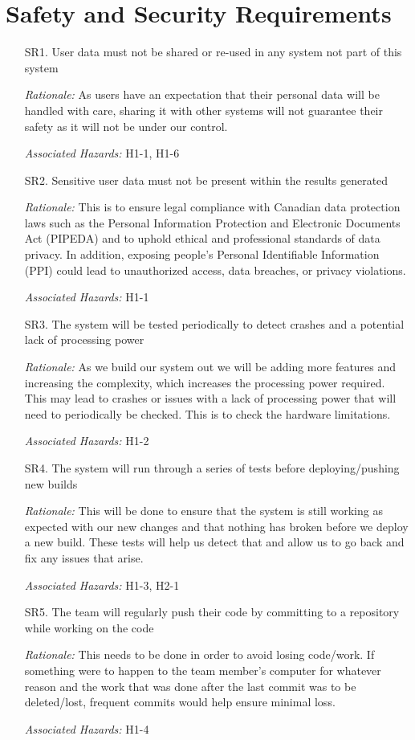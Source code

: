 \documentclass{article}
\begin{document}
\section{Safety and Security Requirements}
\begin{enumerate}
   \item[SR1.] User data must not be shared or re-used in any system not part of this system
   \item[] \emph{Rationale:}  As users have an expectation that their personal data will be handled with care, sharing it with other systems will not guarantee their safety as it will not be under our control.
   \item[] \emph{Associated Hazards:} H1-1, H1-6\\
   \item[SR2.] Sensitive user data must not be present within the results generated
   \item[] \emph{Rationale:}  This is to ensure legal compliance with Canadian data protection laws such as the Personal Information Protection and Electronic Documents Act (PIPEDA) and to uphold ethical and professional standards of data privacy. In addition, exposing people's Personal Identifiable Information (PPI) could lead to unauthorized access, data breaches, or privacy violations.
   \item[] \emph{Associated Hazards:} H1-1\\
 
   \item[SR3.] The system will be tested periodically to detect crashes and a potential lack of processing power
   \item[] \emph{Rationale:} As we build our system out we will be adding more features and increasing the complexity, which increases the processing power required. This may lead to crashes or issues with a lack of processing power that will need to periodically be checked. This is to check the hardware limitations.
   \item[] \emph{Associated Hazards:} H1-2\\
   \item[SR4.] The system will run through a series of tests before deploying/pushing new builds
   \item[] \emph{Rationale:} This will be done to ensure that the system is still working as expected with our new changes and that nothing has broken before we deploy a new build. These tests will help us detect that and allow us to go back and fix any issues that arise.
   \item[] \emph{Associated Hazards:} H1-3, H2-1  \\
   \item[SR5.] The team will regularly push their code by committing to a repository while working on the code
   \item[] \emph{Rationale:} This needs to be done in order to avoid losing code/work. If something were to happen to the team member's computer for whatever reason and the work that was done after the last commit was to be deleted/lost, frequent commits would help ensure minimal loss.
   \item[] \emph{Associated Hazards:} H1-4 \\
 

\end{enumerate}
\end{document}
